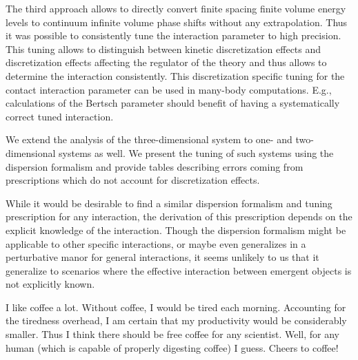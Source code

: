 The third approach allows to directly convert finite spacing finite volume energy levels to continuum infinite volume phase shifts without any extrapolation.
Thus it was possible to consistently tune the interaction parameter to high precision.
This tuning allows to distinguish between kinetic discretization effects and discretization effects affecting the regulator of the theory and thus allows to determine the interaction consistently.
This discretization specific tuning for the contact interaction parameter can be used in many-body computations.
E.g., calculations of the Bertsch parameter should benefit of having a systematically correct tuned interaction.

We extend the analysis of the three-dimensional system to one- and two-dimensional systems as well.
We present the tuning of such systems using the dispersion formalism and provide tables describing errors coming from prescriptions which do not account for discretization effects.

While it would be desirable to find a similar dispersion formalism and tuning prescription for any interaction, the derivation of this prescription depends on the explicit knowledge of the interaction.
Though the dispersion formalism might be applicable to other specific interactions, or maybe even generalizes in a perturbative manor for general interactions, it seems unlikely to us that it generalize to scenarios where the effective interaction between emergent objects is not explicitly known.


I like coffee a lot.
Without coffee, I would be tired each morning.
Accounting for the tiredness overhead, I am certain that my productivity would be considerably smaller.
Thus I think there should be free coffee for any scientist.
Well, for any human (which is capable of properly digesting coffee) I guess.
Cheers to coffee!
